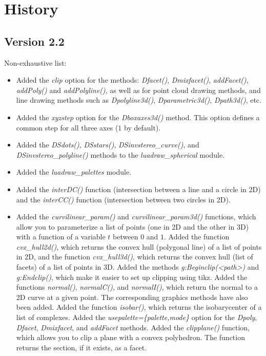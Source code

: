 \section{History}

\subsection{Version 2.2}
Non-exhaustive list:
\begin{itemize}
    \item Added the \emph{clip} option for the methods: \emph{Dfacet()}, \emph{Dmixfacet()}, \emph{addFacet()}, \emph{addPoly()} and \emph{addPolyline()}, as well as for point cloud drawing methods, and line drawing methods such as \emph{Dpolyline3d()}, \emph{Dparametric3d()}, \emph{Dpath3d()}, etc.
    \item Added the \emph{xyzstep} option for the \emph{Dboxaxes3d()} method. This option defines a common step for all three axes ($1$ by default).     \item Added the \emph{DSdots()}, \emph{DSstars()}, \emph{DSinvstereo\_curve()}, and \emph{DSinvstereo\_polyline()} methods to the \emph{luadraw\_spherical} module.
    \item Added the \emph{luadraw\_palettes} module.
    \item Added the \emph{interDC()} function (intersection between a line and a circle in 2D) and the \emph{interCC()} function (intersection between two circles in 2D).
    \item Added the \emph{curvilinear\_param()} and \emph{curvilinear\_param3d()} functions, which allow you to parameterize a list of points (one in 2D and the other in 3D) with a function of a variable $t$ between $0$ and $1$.
Added the function \emph{cvx\_hull2d()}, which returns the convex hull (polygonal line) of a list of points in 2D, and the function \emph{cvx\_hull3d()}, which returns the convex hull (list of facets) of a list of points in 3D.
Added the methods \emph{g:Beginclip(<path>)} and \emph{g:Endclip()}, which make it easier to set up clipping using tikz.
Added the functions \emph{normal()}, \emph{normalC()}, and \emph{normalI()}, which return the normal to a 2D curve at a given point. The corresponding graphics methods have also been added.
Added the function \emph{isobar()}, which returns the isobarycenter of a list of complexes. Added the \emph{usepalette=\{palette,mode\}} option for the \emph{Dpoly}, \emph{Dfacet}, \emph{Dmixfacet}, and \emph{addFacet} methods.
Added the \emph{clipplane()} function, which allows you to clip a plane with a convex polyhedron. The function returns the section, if it exists, as a facet.

\end{itemize}

